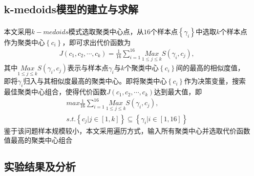 \documentclass{whutmod}
\newcommand{\upcite}[1]{\textsuperscript{\cite{#1}}}
\begin{document}
  	\subsection{k-medoids模型的建立与求解}
  	本文采用$k-medoids$模式选取聚类中心点\upcite{14,15}，从$16$个样本点$\left \{ \gamma_i  \right \}$中选取$k$个样本点作为聚类中心$\left \{ c_i \right \}$，即可求出代价函数为
  	\begin{gather}
  J(c_1,c_2,\cdots,c_k)=\frac{1}{16}\sum _{i=1}^{16}\underset{1\leqslant j\leqslant k}{Max}S(\gamma _i,c_j),
  	\end{gather}
  	其中$\underset{1\leqslant j\leqslant k}{Max}S(\gamma _i,c_j)$表示与样本点$ \gamma_i $与$k$个聚类中心$\left \{ c_i \right \}$间的最高的相似度值，即将$\gamma _i$归入与其相似度最高的聚类中心。即将聚类中心$\left \{ c_i \right \}$作为决策变量，搜索最佳聚类中心组合，使得代价函数$J(c_1,c_2,\cdots,c_k)$达到最大值，即
      	\begin{gather}
      max \frac{1}{16}\sum _{i=1}^{16}\underset{1\leqslant j\leqslant k}{Max}S(\gamma _i,c_j),\\
      s.t.\left \{  c_j  | j\in [1,k] \right \}  \subseteq  \left \{ \gamma _i | i\in [1,16]\right \} 
      \end{gather}
  	鉴于该问题样本规模较小，本文采用遍历方式，输入所有聚类中心并选取代价函数值最高的聚类中心组合
  	\subsection{实验结果及分析}

  
\end{document}
